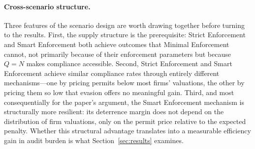 \paragraph{Cross-scenario structure.}

Three features of the scenario design are worth drawing together before turning to the results. First, the supply structure is the prerequisite: Strict Enforcement and Smart Enforcement both achieve outcomes that Minimal Enforcement cannot, not primarily because of their enforcement parameters but because $Q = N$ makes compliance accessible. Second, Strict Enforcement and Smart Enforcement achieve similar compliance rates through entirely different mechanisms---one by pricing permits below most firms' valuations, the other by pricing them so low that evasion offers no meaningful gain. Third, and most consequentially for the paper's argument, the Smart Enforcement mechanism is structurally more resilient: its deterrence margin does not depend on the distribution of firm valuations, only on the permit price relative to the expected penalty. Whether this structural advantage translates into a measurable efficiency gain in audit burden is what Section~\ref{sec:results} examines.
